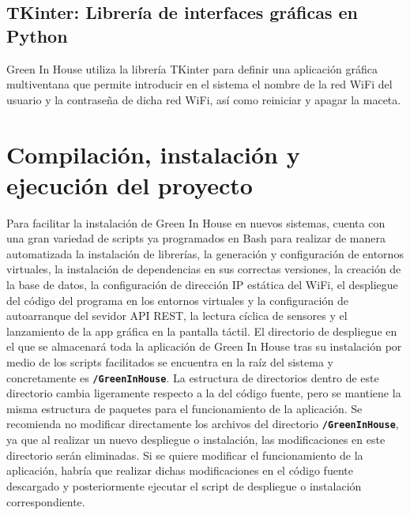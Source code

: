     \subsection{TKinter:  Librería de interfaces gráficas en Python}
    Green In House utiliza la librería TKinter \cite{wiki:tkinter} para definir una aplicación gráfica multiventana que permite introducir en el sistema el nombre de la red WiFi del usuario y la contraseña de dicha red WiFi, así como reiniciar y apagar la maceta.

\section{Compilación, instalación y ejecución del proyecto}
Para facilitar la instalación de Green In House en nuevos sistemas, cuenta con una gran variedad de scripts ya programados en Bash para realizar de manera automatizada la instalación de librerías, la generación y configuración de entornos virtuales, la instalación de dependencias en sus correctas versiones, la creación de la base de datos, la configuración de dirección IP estática del WiFi, el despliegue del código del programa en los entornos virtuales y la configuración de autoarranque del sevidor API REST, la lectura cíclica de sensores y el lanzamiento de la app gráfica en la pantalla táctil.
El directorio de despliegue en el que se almacenará toda la aplicación de Green In House tras su instalación por medio de los scripts facilitados se encuentra en la raíz del sistema y concretamente es \textbf{\texttt{/GreenInHouse}}. La estructura de directorios dentro de este directorio cambia ligeramente respecto a la del código fuente, pero se mantiene la misma estructura de paquetes para el funcionamiento de la aplicación. Se recomienda no modificar directamente los archivos del directorio \textbf{\texttt{/GreenInHouse}}, ya que al realizar un nuevo despliegue o instalación, las modificaciones en este directorio serán eliminadas. Si se quiere modificar el funcionamiento de la aplicación, habría que realizar dichas modificaciones en el código fuente descargado y posteriormente ejecutar el script de despliegue o instalación correspondiente.

